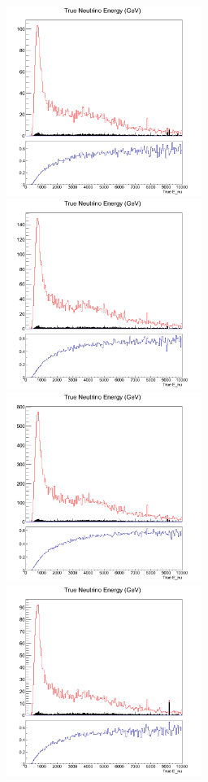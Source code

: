 \begin{figure}[h]
\centering
\includegraphics[width=2.5in]{Figures/TN100Plots/c_nuEwater_1.png}
\includegraphics[width=2.5in]{Figures/TN100Plots/c_nuEwater_2.png}
\includegraphics[width=2.5in]{Figures/TN100Plots/c_nuEwater_4.png}
\includegraphics[width=2.5in]{Figures/TN100Plots/c_nuEair_2.png}

\end{figure}
